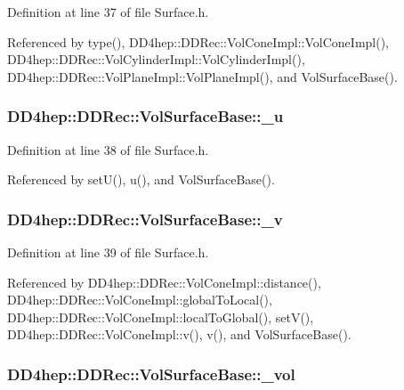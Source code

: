 Definition at line 37 of file Surface.h.

Referenced by type(), DD4hep::DDRec::VolConeImpl::VolConeImpl(), DD4hep::DDRec::VolCylinderImpl::VolCylinderImpl(), DD4hep::DDRec::VolPlaneImpl::VolPlaneImpl(), and VolSurfaceBase().\hypertarget{class_d_d4hep_1_1_d_d_rec_1_1_vol_surface_base_a15a2648f8b9ead47a28826e4ad0cc6c7}{
\subsubsection[{\_\-u}]{ {\bf DD4hep::DDRec::VolSurfaceBase::\_\-u}}}
\label{class_d_d4hep_1_1_d_d_rec_1_1_vol_surface_base_a15a2648f8b9ead47a28826e4ad0cc6c7}


Definition at line 38 of file Surface.h.

Referenced by setU(), u(), and VolSurfaceBase().\hypertarget{class_d_d4hep_1_1_d_d_rec_1_1_vol_surface_base_afc7d4d47e7fa6c7a8c87a52e15177bdb}{
\subsubsection[{\_\-v}]{ {\bf DD4hep::DDRec::VolSurfaceBase::\_\-v}}}
\label{class_d_d4hep_1_1_d_d_rec_1_1_vol_surface_base_afc7d4d47e7fa6c7a8c87a52e15177bdb}


Definition at line 39 of file Surface.h.

Referenced by DD4hep::DDRec::VolConeImpl::distance(), DD4hep::DDRec::VolConeImpl::globalToLocal(), DD4hep::DDRec::VolConeImpl::localToGlobal(), setV(), DD4hep::DDRec::VolConeImpl::v(), v(), and VolSurfaceBase().\hypertarget{class_d_d4hep_1_1_d_d_rec_1_1_vol_surface_base_afbd867fb78d3da533b12850d152005c2}{
\subsubsection[{\_\-vol}]{ {\bf DD4hep::DDRec::VolSurfaceBase::\_\-vol}}}
\label{class_d_d4hep_1_1_d_d_rec_1_1_vol_surface_base_afbd867fb78d3da533b12850d152005c2}


